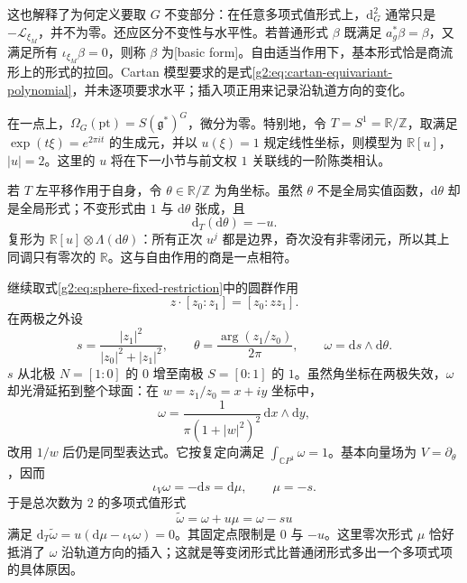 这也解释了为何定义要取 \(G\) 不变部分：在任意多项式值形式上，\(\mathrm d_G^2\) 通常只是 \(-\mathcal L_{\xi_M}\)，并不为零。还应区分不变性与水平性。若普通形式 \(\beta\) 既满足 \(a_g^*\beta=\beta\)，又满足所有 \(\iota_{\xi_M}\beta=0\)，则称 \(\beta\) 为[basic form]。自由适当作用下，基本形式恰是商流形上的形式的拉回。Cartan 模型要求的是式\eqref{g2:eq:cartan-equivariant-polynomial}，并未逐项要求水平；插入项正用来记录沿轨道方向的变化。

\begin{example}\label{g2:ex:cartan-point-circle}
	在一点上，\(\Omega_G(\mathrm{pt})=S(\mathfrak g^*)^G\)，微分为零。特别地，令 \(T=S^1=\mathbb R/\mathbb Z\)，取满足 \(\exp(t\xi)=e^{2\pi it}\) 的生成元，并以 \(u(\xi)=1\) 规定线性坐标，则模型为 \(\mathbb R[u]\)，\(\lvert u\rvert=2\)。这里的 \(u\) 将在下一小节与前文权 \(1\) 关联线的一阶陈类相认。

	若 \(T\) 左平移作用于自身，令 \(\theta\in\mathbb R/\mathbb Z\) 为角坐标。虽然 \(\theta\) 不是全局实值函数，\(\mathrm d\theta\) 却是全局形式；不变形式由 \(1\) 与 \(\mathrm d\theta\) 张成，且
	\[
		\mathrm d_T(\mathrm d\theta)=-u.
	\]
	复形为 \(\mathbb R[u]\otimes\Lambda(\mathrm d\theta)\)：所有正次 \(u^j\) 都是边界，奇次没有非零闭元，所以其上同调只有零次的 \(\mathbb R\)。这与自由作用的商是一点相符。
\end{example}

\begin{example}\label{g2:ex:cartan-rotating-sphere}
	继续取式\eqref{g2:eq:sphere-fixed-restriction}中的圆群作用
	\[
		z\cdot[z_0:z_1]=[z_0:zz_1].
	\]
	在两极之外设
	\[
		s=\frac{|z_1|^2}{|z_0|^2+|z_1|^2},\qquad
		\theta=\frac{\arg(z_1/z_0)}{2\pi},\qquad
		\omega=\mathrm ds\wedge\mathrm d\theta.
	\]
	\(s\) 从北极 \(N=[1:0]\) 的 \(0\) 增至南极 \(S=[0:1]\) 的 \(1\)。虽然角坐标在两极失效，\(\omega\) 却光滑延拓到整个球面：在 \(w=z_1/z_0=x+iy\) 坐标中，
	\[
		\omega=\frac{1}{\pi(1+|w|^2)^2}\,\mathrm dx\wedge\mathrm dy,
	\]
	改用 \(1/w\) 后仍是同型表达式。它按复定向满足 \(\int_{\mathbb CP^1}\omega=1\)。基本向量场为 \(V=\partial_\theta\)，因而
	\[
		\iota_V\omega=-\mathrm ds=\mathrm d\mu,\qquad \mu=-s.
	\]
	于是总次数为 \(2\) 的多项式值形式
	\begin{equation}\label{g2:eq:cartan-sphere-form}
		\widetilde\omega=\omega+u\mu=\omega-su
	\end{equation}
	满足 \(\mathrm d_T\widetilde\omega=u(\mathrm d\mu-\iota_V\omega)=0\)。其固定点限制是 \(0\) 与 \(-u\)。这里零次形式 \(\mu\) 恰好抵消了 \(\omega\) 沿轨道方向的插入；这就是等变闭形式比普通闭形式多出一个多项式项的具体原因。
\end{example}


